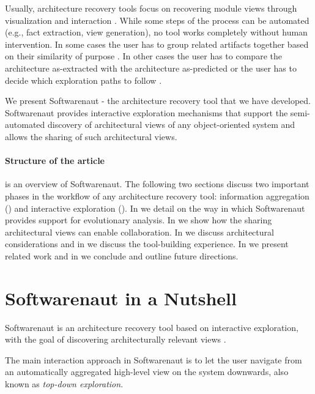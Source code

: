 \documentclass[preprint,12pt]{elsarticle}
\begin{document}
Usually, architecture recovery tools focus on recovering module views through visualization and interaction \cite{murphy-reflexion, muller-rigi, storey-shrimp}. While some steps of the process can be automated (e.g., fact extraction, view generation), no tool works completely without human intervention. In some cases the user has to group related artifacts together based on their similarity of purpose \cite{muller-rigi}. In other cases the user has to compare the architecture as-extracted with the architecture as-predicted \cite{murphy-reflexion} or the user has to decide which exploration paths to follow \cite{storey-shrimp}.

We present Softwarenaut \cite{lungu-relevo, lungu-packages} - the architecture recovery tool that we have developed. Softwarenaut provides interactive exploration mechanisms that support the semi-automated discovery of architectural views of any object-oriented system and allows the sharing of such architectural views. 

{
\paragraph{Structure of the article}  is an overview of Softwarenaut. The following two sections discuss two important phases in the workflow of any architecture recovery tool: information aggregation () and interactive exploration (). In  we detail on the way in which Softwarenaut provides support for evolutionary analysis. In  we show how the sharing architectural views can enable collaboration. In  we discuss architectural considerations and in  we discuss the tool-building experience. In  we present related work and in  we conclude and outline future directions.

}
\section {Softwarenaut in a Nutshell} \label{sec:over}

Softwarenaut is an architecture recovery tool based on interactive exploration, with the goal of discovering architecturally relevant views \cite{lungu-packages}.

The main interaction approach in Softwarenaut is to let the user navigate from an automatically aggregated high-level view on the system downwards, also known as {\em top-down exploration}.
\end{document}
